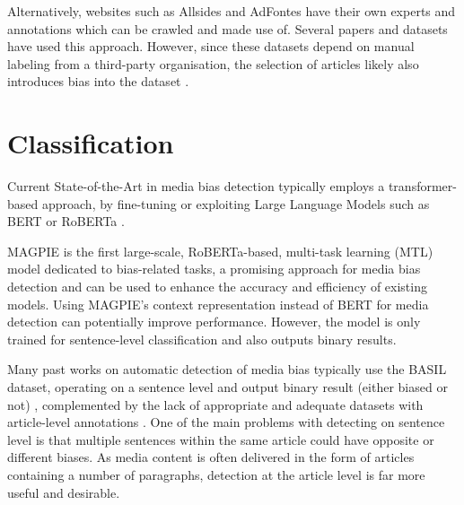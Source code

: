 Alternatively, websites such as Allsides and AdFontes have their own experts and annotations which can be crawled and made use of. Several papers and datasets \cite{spinde-2023-bat,chen-2020-nlpcss,kulkarni-2018-multi-view} have used this approach.  However, since these datasets depend on manual labeling from a third-party organisation, the selection of articles likely also introduces bias into the dataset \cite{spinde-2023-bat}.

\begin{comment}
News Unfold: (NewsUnravel shows that a user-centric approach to media bias data collection can re- turn reliable data while being scalable and evaluated as easy to use. NewsUnravel demonstrates that feedback mechanisms are a promising strategy to reduce data collection expenses and continuously update datasets to changes in context.) (Our approach augments dataset quality by significantly increasing inter-annotator agreement by 26.31\% and improving classifier performance by 2.49\%)
\end{comment}

\section{Classification}

Current State-of-the-Art in media bias detection typically employs a transformer-based approach, by fine-tuning or exploiting Large Language Models such as BERT \cite{devlin-2019-bert} or RoBERTa \cite{liu-2019-roberta}.

MAGPIE \cite{horych-2024-magpie} is the first large-scale, RoBERTa-based, multi-task learning (MTL) model dedicated to bias-related tasks, a promising approach for media bias detection and can be used to enhance the accuracy and efficiency of existing models. Using MAGPIE's context representation instead of BERT for media detection can potentially improve performance. However, the model is only trained for sentence-level classification and also outputs binary results.

Many past works on automatic detection of media bias typically use the BASIL dataset, operating on a sentence level and output binary result (either biased or not) \cite{maab-2023-lexical-bias-detection, maab-2023-target-aware, guo-2022-modeling, van-den-berg-2020-context,lee-2021-unifying,lei-2022-sentence,lei-2024-event-relation}, complemented by the lack of appropriate and adequate datasets with article-level annotations \cite{demidov-2023-political-bias-classification}. One of the main problems with detecting on sentence level is that multiple sentences within the same article could have opposite or different biases. As media content is often delivered in the form of articles containing a number of paragraphs, detection at the article level is far more useful and desirable.

